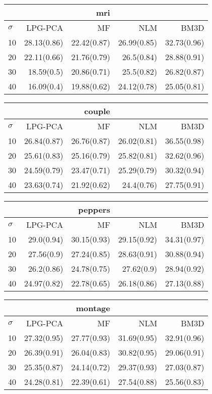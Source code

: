 \noindent\begin{minipage}{.5\linewidth}
\begin{tabular}{lrrrr}
\toprule &&mri\\ \midrule
$\sigma$&LPG-PCA&MF&NLM&BM3D\\
\midrule
10&28.13(0.86)&22.42(0.87)&26.99(0.85)&32.73(0.96)\\
20&22.11(0.66)&21.76(0.79)&26.5(0.84)&28.88(0.91)\\
30&18.59(0.5)&20.86(0.71)&25.5(0.82)&26.82(0.87)\\
40&16.09(0.4)&19.88(0.62)&24.12(0.78)&25.05(0.81)\\
\bottomrule
\end{tabular}
\end{minipage}
\noindent\begin{minipage}{.5\linewidth}
\begin{tabular}{lrrrr}
\toprule &&couple\\ \midrule
$\sigma$&LPG-PCA&MF&NLM&BM3D\\
\midrule
10&26.84(0.87)&26.76(0.87)&26.02(0.81)&36.55(0.98)\\
20&25.61(0.83)&25.16(0.79)&25.82(0.81)&32.62(0.96)\\
30&24.59(0.79)&23.47(0.71)&25.29(0.79)&30.32(0.94)\\
40&23.63(0.74)&21.92(0.62)&24.4(0.76)&27.75(0.91)\\
\bottomrule
\end{tabular}
\end{minipage}
\noindent\begin{minipage}{.5\linewidth}
\begin{tabular}{lrrrr}
\toprule &&peppers\\ \midrule
$\sigma$&LPG-PCA&MF&NLM&BM3D\\
\midrule
10&29.0(0.94)&30.15(0.93)&29.15(0.92)&34.31(0.97)\\
20&27.56(0.9)&27.24(0.85)&28.63(0.91)&30.88(0.94)\\
30&26.2(0.86)&24.78(0.75)&27.62(0.9)&28.94(0.92)\\
40&24.97(0.82)&22.78(0.65)&26.18(0.86)&27.13(0.88)\\
\bottomrule
\end{tabular}
\end{minipage}
\noindent\begin{minipage}{.5\linewidth}
\begin{tabular}{lrrrr}
\toprule &&montage\\ \midrule
$\sigma$&LPG-PCA&MF&NLM&BM3D\\
\midrule
10&27.32(0.95)&27.77(0.93)&31.69(0.95)&32.91(0.96)\\
20&26.39(0.91)&26.04(0.83)&30.82(0.95)&29.06(0.91)\\
30&25.35(0.87)&24.14(0.72)&29.37(0.93)&27.03(0.87)\\
40&24.28(0.81)&22.39(0.61)&27.54(0.88)&25.56(0.83)\\
\bottomrule
\end{tabular}
\end{minipage}
